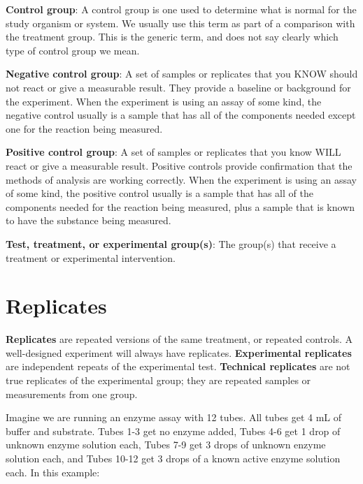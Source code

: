 \documentclass[
]{book}
\begin{document}
\textbf{Control group}: A control group is one used to determine what is normal for the study organism or system. We usually use this term as part of a comparison with the treatment group. This is the generic term, and does not say clearly which type of control group we mean.

\textbf{Negative control group}: A set of samples or replicates that you KNOW should not react or give a measurable result. They provide a baseline or background for the experiment. When the experiment is using an assay of some kind, the negative control usually is a sample that has all of the components needed except one for the reaction being measured.

\textbf{Positive control group}: A set of samples or replicates that you know WILL react or give a measurable result. Positive controls provide confirmation that the methods of analysis are working correctly. When the experiment is using an assay of some kind, the positive control usually is a sample that has all of the components needed for the reaction being measured, plus a sample that is known to have the substance being measured.

\textbf{Test, treatment, or experimental group(s)}: The group(s) that receive a treatment or experimental intervention.

\hypertarget{replicates}{%
\section{Replicates}\label{replicates}}

\textbf{Replicates} are repeated versions of the same treatment, or repeated controls. A well-designed experiment will always have replicates. \textbf{Experimental replicates} are independent repeats of the experimental test. \textbf{Technical replicates} are not true replicates of the experimental group; they are repeated samples or measurements from one group.

Imagine we are running an enzyme assay with 12 tubes. All tubes get 4 mL of buffer and substrate. Tubes 1-3 get no enzyme added, Tubes 4-6 get 1 drop of unknown enzyme solution each, Tubes 7-9 get 3 drops of unknown enzyme solution each, and Tubes 10-12 get 3 drops of a known active enzyme solution each. In this example:
\end{document}
